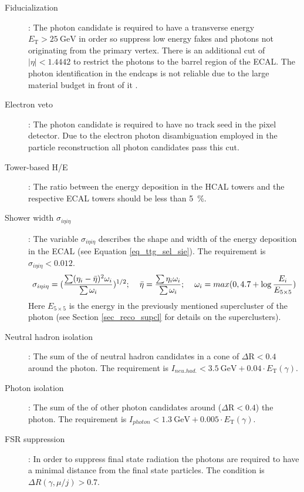 \begin{description}
\item[Fiducialization]: The photon candidate is required to have a transverse energy $E_{\mathrm{T}} > \SI{25}{\giga \electronvolt}$ in order so suppress low energy fakes and photons not originating from the primary vertex. There is an additional cut of $| \eta | < 1.4442$ to restrict the photons to the barrel region of the ECAL. The photon identification in the endcaps is not reliable due to the large material budget in front of it \cite{tholen:ma}.
\item[Electron veto]: The photon candidate is required to have no track seed in the pixel detector. Due to the electron photon disambiguation employed in the particle reconstruction all photon candidates pass this cut.
\item[Tower-based H/E]: The ratio between the energy deposition in the HCAL towers and the respective ECAL towers should be less than \SI{5}{\percent}.
\item[Shower width $\sigma_{i \eta i \eta}$]: The variable $\sigma_{i \eta i \eta}$ describes the shape and width of the energy deposition in the ECAL (see Equation \ref{eq_ttg_sel_sie}). The requirement is $\sigma_{i \eta i \eta} < 0.012$.
\begin{equation}
\sigma_{i \eta i \eta} = (\frac{\sum (\eta_i - \bar{\eta})^2 \omega_i}{\sum \omega_i})^{1/2} ; \hspace{0.4cm} \bar{\eta} = \frac{\sum \eta_i \omega_i}{\sum \omega_i}; \hspace{0.4cm} \omega_i = max(0,4.7 + \log{\frac{E_i}{E_{5 \times 5}}})
\label{eq_ttg_sel_sie}
\end{equation}
Here $E_{5 \times 5}$ is the energy in the previously mentioned supercluster of the photon (see Section \ref{sec_reco_supcl} for details on the superclusters).
\item[Neutral hadron isolation]: The sum of the \pt of neutral hadron candidates in a cone of $\Delta \mathrm{R} < 0.4$ around the photon. The requirement is $I_{neu.had.} < \SI{3.5}{\giga \electronvolt} + 0.04 \cdot E_{\mathrm{T}}(\gamma)$.
\item[Photon isolation]: The sum of the \pt of other photon candidates around ($\Delta \mathrm{R} < 0.4$) the photon. The requirement is $I_{photon} < \SI{1.3}{\giga \electronvolt} + 0.005 \cdot E_{\mathrm{T}}(\gamma)$. 
\item[FSR suppression]: In order to suppress final state radiation the photons are required to have a minimal distance from the final state particles. The condition is $\Delta R (\gamma,\mu /j) > 0.7$.
\end{description}

